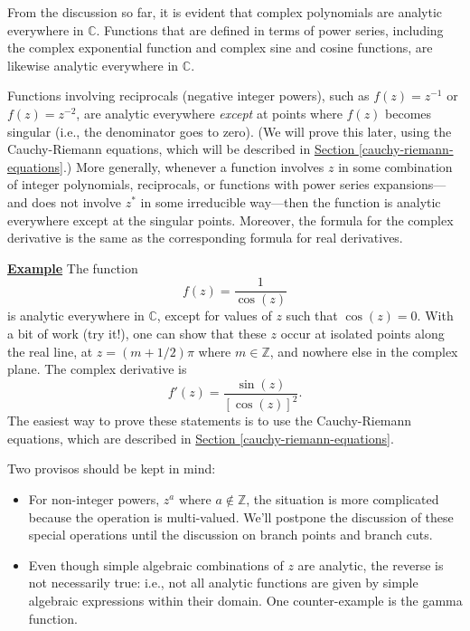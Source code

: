 \documentclass[10pt,a4paper]{article}
\begin{document}
From the discussion so far, it is evident that complex polynomials are
analytic everywhere in $\mathbb{C}$. Functions that are defined in
terms of power series, including the complex exponential function and
complex sine and cosine functions, are likewise analytic everywhere in
$\mathbb{C}$.

Functions involving reciprocals (negative integer powers), such as
$f(z) = z^{-1}$ or $f(z) = z^{-2}$, are analytic everywhere
\emph{except} at points where $f(z)$ becomes singular (i.e., the
denominator goes to zero). (We will prove this later, using the
Cauchy-Riemann equations, which will be described in
\hyperref[cauchy-riemann-equations]{Section
  \ref{cauchy-riemann-equations}}.) More generally, whenever a
function involves $z$ in some combination of integer polynomials,
reciprocals, or functions with power series expansions---and does not
involve $z^*$ in some irreducible way---then the function is analytic
everywhere except at the singular points.  Moreover, the formula for
the complex derivative is the same as the corresponding formula for
real derivatives.

\begin{framed}
\noindent
\underline{\textbf{Example}}
\vskip 0.1in \noindent
The function
\begin{equation}
  f(z) = \frac{1}{\cos(z)}
\end{equation}
is analytic everywhere in $\mathbb{C}$, except for values of $z$ such
that $\cos(z) = 0$.  With a bit of work (try it!), one can show that
these $z$ occur at isolated points along the real line, at $z =
(m+1/2)\pi$ where $m \in \mathbb{Z}$, and nowhere else in the complex
plane. The complex derivative is
\begin{equation}
f'(z) = \frac{\sin(z)}{[\cos(z)]^2}.
\end{equation}
The easiest way to prove these statements is to use the Cauchy-Riemann
equations, which are described in
\hyperref[cauchy-riemann-equations]{Section \ref{cauchy-riemann-equations}}.
\end{framed}

Two provisos should be kept in mind:
\begin{itemize}
\item
  For non-integer powers, $z^a$ where $a\notin \mathbb{Z}$, the
  situation is more complicated because the operation is multi-valued.
  We'll postpone the discussion of these special operations until the
  discussion on branch points and branch cuts.
\item
  Even though simple algebraic combinations of $z$ are analytic, the
  reverse is not necessarily true: i.e., not all analytic functions
  are given by simple algebraic expressions within their domain. One
  counter-example is the gamma function.
\end{itemize}
\end{document}
